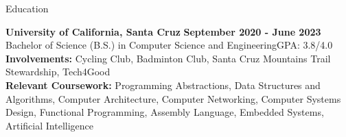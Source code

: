 \documentclass{resume}
\begin{document}
\begin{rSection}{\large Education}

{\bf University of California, Santa Cruz} \hfill {\bf{September 2020 - June 2023}}
\\ Bachelor of Science (B.S.) in Computer Science and Engineering\hfill {GPA: 3.8/4.0}
\\ \textbf{Involvements:}  Cycling Club, Badminton Club, Santa Cruz Mountains Trail Stewardship, Tech4Good
\\ \textbf{Relevant Coursework:} Programming Abstractions, Data Structures and Algorithms, Computer Architecture, Computer Networking, Computer Systems Design, Functional Programming, Assembly Language, Embedded Systems, Artificial Intelligence

\end{rSection}
\end{document}
